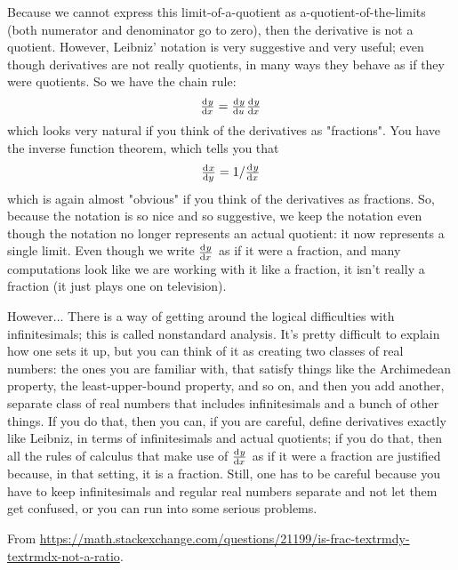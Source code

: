 Because we cannot express this limit-of-a-quotient as a-quotient-of-the-limits (both numerator and denominator go to zero), then the derivative is not a quotient.
However, Leibniz' notation is very suggestive and very useful; even though derivatives are not really quotients, in many ways they behave as if they were quotients. So we have the chain rule:
\begin{displaymath}
  \od{y}{x} = \od{y}{u} \od{y}{x}
\end{displaymath}
which looks very natural if you think of the derivatives as "fractions". You have the inverse function theorem, which tells you that
\begin{displaymath}
  \od{x}{y} = 1/\od{y}{x}
\end{displaymath}
which is again almost "obvious" if you think of the derivatives as fractions. So, because the notation is so nice and so suggestive, we keep the notation even though the notation no longer represents an actual quotient: it now represents a single limit.  Even though we write $ \od{y}{x} $ as if it were a fraction, and many computations look like we are working with it like a fraction, it isn't really a fraction (it just plays one on television).

However... There is a way of getting around the logical difficulties with infinitesimals; this is called nonstandard analysis. It's pretty difficult to explain how one sets it up, but you can think of it as creating two classes of real numbers: the ones you are familiar with, that satisfy things like the Archimedean property, the least-upper-bound property, and so on, and then you add another, separate class of real numbers that includes infinitesimals and a bunch of other things. If you do that, then you can, if you are careful, define derivatives exactly like Leibniz, in terms of infinitesimals and actual quotients; if you do that, then all the rules of calculus that make use of $ \od{y}{x} $ as if it were a fraction are justified because, in that setting, it is a fraction. Still, one has to be careful because you have to keep infinitesimals and regular real numbers separate and not let them get confused, or you can run into some serious problems.

\begin{flushright}
  From \url{https://math.stackexchange.com/questions/21199/is-frac-textrmdy-textrmdx-not-a-ratio}.
\end{flushright}

